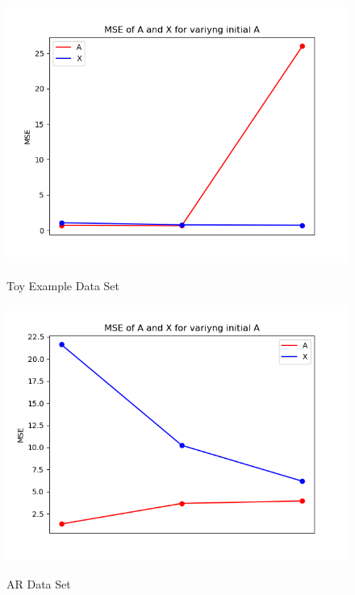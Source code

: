 \begin{figure}[H]
\centering
    \begin{minipage}[t]{.45\textwidth}
        \centering
\includegraphics[scale=0.5]{figures/chapter6/Mix_Error_initial_A_m8_k16_L1000.png}
\label{fig:initialA_mix}
\caption{Toy Example Data Set}
    \end{minipage} 
    \hfill
    \begin{minipage}[t]{.45\textwidth}
        \centering
\includegraphics[scale=0.5]{figures/chapter6/AR_Error_initial_A_m8_k16_L1000.png}
\label{fig:initialA_AR}
\caption{AR Data Set}
    \end{minipage}
\end{figure}
\noindent


